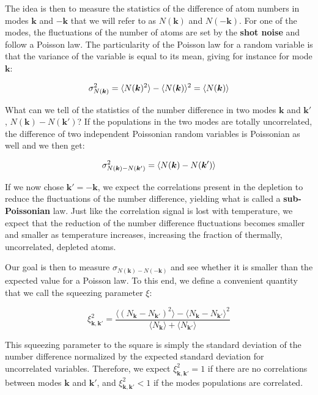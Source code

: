 
 The idea is then to measure the statistics of the difference of atom numbers in modes $\bm{k}$ and $-\bm{k}$ that we will refer to as $N(\bm{k})$ and $N(-\bm{k})$. For one of the modes, the fluctuations of the number of atoms are set by the \textbf{shot noise} and follow a Poisson law. The particularity of the Poisson law for a random variable is that the variance of the variable is equal to its mean, giving for instance for mode $\bm{k}$:

\begin{equation}
    \sigma_{N(\bm{k})}^2 =\langle N(\bm{k})^2\rangle-\langle N(\bm{k})\rangle^2 = \langle N(\bm{k})\rangle
\end{equation}

What can we tell of the statistics of the number difference in two modes $\bm{k}$ and $\bm{k}'$, $N(\bm{k}) - N(\bm{k}')$? If the populations in the two modes are totally uncorrelated, the difference of two independent Poissonian random variables is Poissonian as well and we then get:

\begin{equation}
    \sigma_{N(\bm{k})-N(\bm{k}')}^2 = \langle N(\bm{k})-N(\bm{k}')\rangle
\end{equation}

If we now chose $\bm{k}'=-\bm{k}$, we expect the \kmk correlations present in the depletion to reduce the fluctuations of the number difference, yielding what is called a \textbf{sub-Poissonian} law. Just like the \kmk correlation signal is lost with temperature, we expect that the reduction of the number difference fluctuations becomes smaller and smaller as temperature increases, increasing the fraction of thermally, uncorrelated, depleted atoms. 

Our goal is then to measure $\sigma_{N(\bm{k})-N(-\bm{k})}$ and see whether it is smaller than the expected value for a Poisson law. To this end, we define a convenient quantity that we call the squeezing parameter $\xi$: 

\begin{equation}
    \xi_{\bm{k},\bm{k'}}^2=\frac{\langle (N_{\bm{k}} - N_{\bm{k'}})^2 \rangle - \langle N_{\bm{k}} - N_{\bm{k'}} \rangle^2}{\langle N_{\bm{k}} \rangle + \langle N_{\bm{k'}} \rangle}
\end{equation}

This squeezing parameter to the square is simply the standard deviation of the number difference normalized by the expected standard deviation for uncorrelated variables. Therefore, we expect $\xi^2_{\bm{k},\bm{k}'}=1$ if there are no correlations between modes $\bm{k}$ and $\bm{k'}$, and $\xi^2_{\bm{k},\bm{k}'} < 1$ if the modes populations are correlated.

